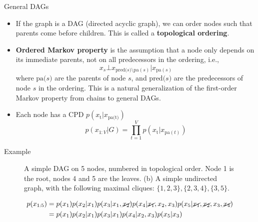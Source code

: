 \documentclass[10pt,mathserif]{beamer}
\begin{document}
\begin{frame}{General DAGs}
\begin{itemize}
    \item If the graph is a DAG (directed acyclic graph), we can order nodes such that parents come before children. This is called a \textbf{topological ordering}.
    
    \item  \textbf{Ordered Markov property} is the assumption that a node only depends on its immediate parents, not on all predecessors in the ordering, i.e.,
    \begin{equation}
        x_{s} \bot x_{\text{pred($s$)\textbackslash pa}(s)}|x_{\text{pa}(s)}
    \end{equation}
    where $\text{pa($s$)}$ are the parents of node $s$, and $\text{pred($s$)}$ are the predecessors of node $s$ in the ordering. This is a natural generalization of the first-order Markov property from chains to general DAGs.
    
    \item Each node has a CPD $p(x_{\text{t}}|x_{\text{pa(t)}})$
    \begin{equation}
        p(x_{1:V}|G) = \prod_{t=1}^V p(x_{\text{t}}|x_{\text{pa}(t)})
    \end{equation}
\end{itemize}   
\end{frame}

\begin{frame}{Example}
\begin{figure}[h]
\centering
{}
\caption{A simple DAG on 5 nodes, numbered in topological order. Node 1 is the root, nodes 4 and 5 are the leaves. (b) A simple undirected graph, with the following maximal cliques: $\{1, 2, 3\}, \{2, 3, 4\}, \{3, 5\}$.}
\end{figure}

\begin{equation}
    \begin{split}
        p(x_{1 : 5}) & = p(x_{1})p(x_{2}|x_{1})p(x_{3}|x_{1},\cancel{x_{2}})p(x_{4}|\cancel{x_{1}},x_{2},x_{3})p(x_{5}|\cancel{x_{1}},\cancel{x_{2}},x_{3},\cancel{x_4})\\
        & = p(x_{1})p(x_{2}|x_{1})p(x_{3}|x_{1})p(x_{4}|x_{2}, x_{3})p(x_{5}|x_{3})
    \end{split}
\end{equation} 
\end{frame}
\end{document}
